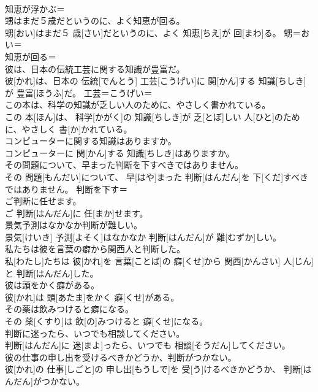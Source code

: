 \documentclass[8pt]{extreport}
\begin{document}
\begin{CJK}{UTF8}{min}
\\	知恵が浮かぶ＝ 
\\	甥はまだ５歳だというのに、よく知恵が回る。	
\\	甥[おい]はまだ５ 歳[さい]だというのに、よく 知恵[ちえ]が 回[まわ]る。	甥＝おい＝ 
\\	知恵が回る＝ 
\\	彼は、日本の伝統工芸に関する知識が豊富だ。	
\\	彼[かれ]は、日本の 伝統[でんとう] 工芸[こうげい]に 関[かん]する 知識[ちしき]が 豊富[ほうふ]だ。	工芸＝こうげい＝ 
\\	この本は、科学の知識が乏しい人のために、やさしく書かれている。	
\\	この 本[ほん]は、 科学[かがく]の 知識[ちしき]が 乏[とぼ]しい 人[ひと]のために、やさしく 書[か]かれている。	
\\	コンピューターに関する知識はありますか。	
\\	コンピューターに 関[かん]する 知識[ちしき]はありますか。	
\\	その問題について、早まった判断を下すべきではありません。	
\\	その 問題[もんだい]について、 早[はや]まった 判断[はんだん]を 下[くだ]すべきではありません。	判断を下す＝ 
\\	ご判断に任せます。	
\\	ご 判断[はんだん]に 任[まか]せます。	
\\	景気予測はなかなか判断が難しい。	
\\	景気[けいき] 予測[よそく]はなかなか 判断[はんだん]が 難[むずか]しい。	
\\	私たちは彼を言葉の癖から関西人と判断した。	
\\	私[わたし]たちは 彼[かれ]を 言葉[ことば]の 癖[くせ]から 関西[かんさい] 人[じん]と 判断[はんだん]した。	
\\	彼は頭をかく癖がある。	
\\	彼[かれ]は 頭[あたま]をかく 癖[くせ]がある。	
\\	その薬は飲みつけると癖になる。	
\\	その 薬[くすり]は 飲[の]みつけると 癖[くせ]になる。	
\\	判断に迷ったら、いつでも相談してください。	
\\	判断[はんだん]に 迷[まよ]ったら、いつでも 相談[そうだん]してください。	
\\	彼の仕事の申し出を受けるべきかどうか、判断がつかない。	
\\	彼[かれ]の 仕事[しごと]の 申し出[もうしで]を 受[う]けるべきかどうか、 判断[はんだん]がつかない。	

\end{CJK}
\end{document}
